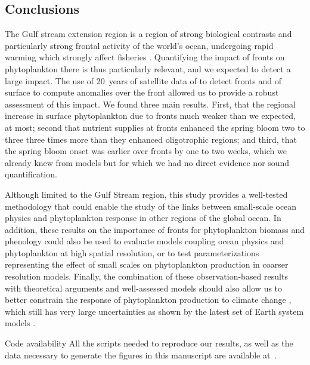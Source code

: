 \subsection{Conclusions}

The Gulf stream extension region is a region of strong biological contrasts and particularly strong frontal activity of the world's ocean, undergoing rapid warming which strongly affect fisheries \parencite{pershing_2015, neto_2021}.
Quantifying the impact of fronts on phytoplankton there is thus particularly relevant, and we expected to detect a large impact.
The use of 20~years of satellite data of  to detect fronts and of surface  to compute anomalies over the front allowed us to provide a robust assessment of this impact.
We found three main results.
First, that the regional increase in surface phytoplankton due to fronts much weaker than we expected,  at most; second that nutrient supplies at fronts enhanced the spring bloom two to three three times more than they enhanced oligotrophic regions; and third, that the spring bloom onset was earlier over fronts by one to two weeks, which we already knew from models \parencite{karleskind_2011, mahadevan_2012} but for which we had no direct evidence nor sound quantification.

Although limited to the Gulf Stream region, this study provides a well-tested methodology that could enable the study of the links between small-scale ocean physics and phytoplankton response in other regions of the global ocean.
In addition, these results on the importance of fronts for phytoplankton biomass and phenology could also be used to evaluate models coupling ocean physics and phytoplankton at high spatial resolution, or to test parameterizations representing the effect of small scales on phytoplankton production in coarser resolution models.
Finally, the combination of these observation-based results with theoretical arguments and well-assessed models should also allow us to better constrain the response of phytoplankton production to climate change \parencite{couespel_2021}, which still has very large uncertainties as shown by the latest set of Earth system models \parencite{kwiatkowski_2020}.


\begin{articleSubBlock}{Code availability}
  All the scripts needed to reproduce our results, as well as the data necessary to generate the figures in this manuscript are available at~\textcite{haeck_2022_zenodo}.
\end{articleSubBlock}


